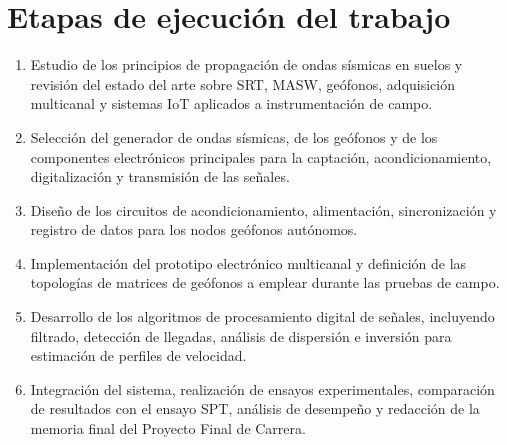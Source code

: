 \documentclass[11pt,a4paper]{article}
\begin{document}
	\section{Etapas de ejecuci\'on del trabajo}
	\begin{enumerate}
		\item Estudio de los principios de propagaci\'on de ondas s\'ismicas en suelos y revisi\'on del estado del arte sobre SRT, MASW, ge\'ofonos, adquisici\'on multicanal y sistemas IoT aplicados a instrumentaci\'on de campo.
		\item Selecci\'on del generador de ondas s\'ismicas, de los ge\'ofonos y de los componentes electr\'onicos principales para la captaci\'on, acondicionamiento, digitalizaci\'on y transmisi\'on de las se\~nales.
		\item Dise\~no de los circuitos de acondicionamiento, alimentaci\'on, sincronizaci\'on y registro de datos para los nodos ge\'ofonos aut\'onomos.
		\item Implementaci\'on del prototipo electr\'onico multicanal y definici\'on de las topolog\'ias de matrices de ge\'ofonos a emplear durante las pruebas de campo.
		\item Desarrollo de los algoritmos de procesamiento digital de se\~nales, incluyendo filtrado, detecci\'on de llegadas, an\'alisis de dispersi\'on e inversi\'on para estimaci\'on de perfiles de velocidad.
		\item Integraci\'on del sistema, realizaci\'on de ensayos experimentales, comparaci\'on de resultados con el ensayo SPT, an\'alisis de desempe\~no y redacci\'on de la memoria final del Proyecto Final de Carrera.
	\end{enumerate}
	
\end{document}
